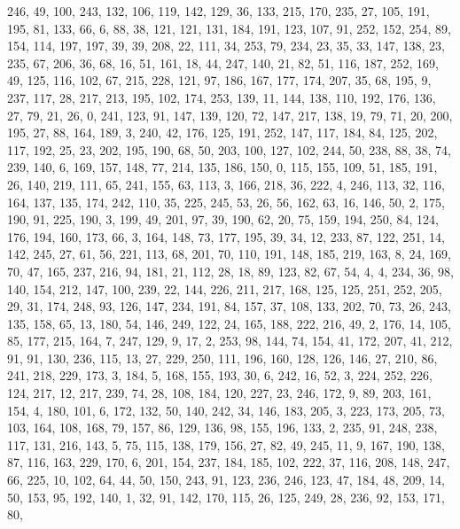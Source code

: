 \begin{DoxyCode}
       246, 49, 100, 243, 132, 106, 119, 142, 129, 36, 133, 215, 170, 235, 27, 105, 191, 195, 81, 133, 66, 6, 88,
       38, 121, 121, 131, 184, 191, 123, 107, 91, 252, 152, 254, 89, 154, 114, 197, 197, 39, 39, 208, 22, 111, 34,
       253, 79, 234, 23, 35, 33, 147, 138, 23, 235, 67, 206, 36, 68, 16, 51, 161, 18, 44, 247, 140, 21, 82, 51,
       116, 187, 252, 169, 49, 125, 116, 102, 67, 215, 228, 121, 97, 186, 167, 177, 174, 207, 35, 68, 195, 9, 237,
       117, 28, 217, 213, 195, 102, 174, 253, 139, 11, 144, 138, 110, 192, 176, 136, 27, 79, 21, 26, 0, 241, 123, 91,
       147, 139, 120, 72, 147, 217, 138, 19, 79, 71, 20, 200, 195, 27, 88, 164, 189, 3, 240, 42, 176, 125, 191,
       252, 147, 117, 184, 84, 125, 202, 117, 192, 25, 23, 202, 195, 190, 68, 50, 203, 100, 127, 102, 244, 50, 238,
       88, 38, 74, 239, 140, 6, 169, 157, 148, 77, 214, 135, 186, 150, 0, 115, 155, 109, 51, 185, 191, 26, 140, 219,
       111, 65, 241, 155, 63, 113, 3, 166, 218, 36, 222, 4, 246, 113, 32, 116, 164, 137, 135, 174, 242, 110, 35,
       225, 245, 53, 26, 56, 162, 63, 16, 146, 50, 2, 175, 190, 91, 225, 190, 3, 199, 49, 201, 97, 39, 190, 62, 20,
       75, 159, 194, 250, 84, 124, 176, 194, 160, 173, 66, 3, 164, 148, 73, 177, 195, 39, 34, 12, 233, 87, 122, 251,
       14, 142, 245, 27, 61, 56, 221, 113, 68, 201, 70, 110, 191, 148, 185, 219, 163, 8, 24, 169, 70, 47, 165,
       237, 216, 94, 181, 21, 112, 28, 18, 89, 123, 82, 67, 54, 4, 4, 234, 36, 98, 140, 154, 212, 147, 100, 239, 22,
       144, 226, 211, 217, 168, 125, 125, 251, 252, 205, 29, 31, 174, 248, 93, 126, 147, 234, 191, 84, 157, 37, 108,
       133, 202, 70, 73, 26, 243, 135, 158, 65, 13, 180, 54, 146, 249, 122, 24, 165, 188, 222, 216, 49, 2, 176,
       14, 105, 85, 177, 215, 164, 7, 247, 129, 9, 17, 2, 253, 98, 144, 74, 154, 41, 172, 207, 41, 212, 91, 91, 130,
       236, 115, 13, 27, 229, 250, 111, 196, 160, 128, 126, 146, 27, 210, 86, 241, 218, 229, 173, 3, 184, 5, 168,
       155, 193, 30, 6, 242, 16, 52, 3, 224, 252, 226, 124, 217, 12, 217, 239, 74, 28, 108, 184, 120, 227, 23, 246,
       172, 9, 89, 203, 161, 154, 4, 180, 101, 6, 172, 132, 50, 140, 242, 34, 146, 183, 205, 3, 223, 173, 205, 73,
       103, 164, 108, 168, 79, 157, 86, 129, 136, 98, 155, 196, 133, 2, 235, 91, 248, 238, 117, 131, 216, 143, 5,
       75, 115, 138, 179, 156, 27, 82, 49, 245, 11, 9, 167, 190, 138, 87, 116, 163, 229, 170, 6, 201, 154, 237, 184,
       185, 102, 222, 37, 116, 208, 148, 247, 66, 225, 10, 102, 64, 44, 50, 150, 243, 91, 123, 236, 246, 123, 47,
       184, 48, 209, 14, 50, 153, 95, 192, 140, 1, 32, 91, 142, 170, 115, 26, 125, 249, 28, 236, 92, 153, 171, 80,

\end{DoxyCode}
